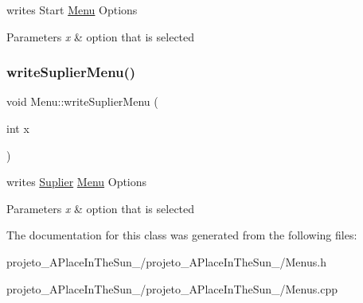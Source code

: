 writes Start \hyperlink{class_menu}{Menu} Options 


\begin{DoxyParams}{Parameters}
{\em x} & option that is selected \\
\hline
\end{DoxyParams}
\hypertarget{class_menu_a334f5dc94dfbf43d56aa4c3a94cf8f11}{}\label{class_menu_a334f5dc94dfbf43d56aa4c3a94cf8f11} 
\subsubsection{\texorpdfstring{write\+Suplier\+Menu()}{writeSuplierMenu()}}
{\footnotesize\ttfamily void Menu\+::write\+Suplier\+Menu (\begin{DoxyParamCaption}\item[{int}]{x }\end{DoxyParamCaption})}



writes \hyperlink{class_suplier}{Suplier} \hyperlink{class_menu}{Menu} Options 


\begin{DoxyParams}{Parameters}
{\em x} & option that is selected \\
\hline
\end{DoxyParams}


The documentation for this class was generated from the following files\+:\begin{DoxyCompactItemize}
\item 
projeto\+\_\+\+A\+Place\+In\+The\+Sun\+\_/projeto\+\_\+\+A\+Place\+In\+The\+Sun\+\_/Menus.\+h\item 
projeto\+\_\+\+A\+Place\+In\+The\+Sun\+\_/projeto\+\_\+\+A\+Place\+In\+The\+Sun\+\_/Menus.\+cpp\end{DoxyCompactItemize}
